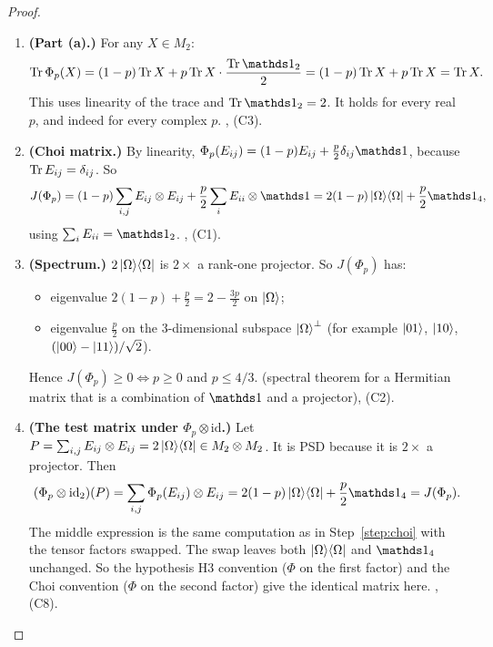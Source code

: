 \documentclass[11pt]{article}
\begin{document}
\begin{proof}
\begin{enumerate}
  \item\label{step:trace} \textbf{(Part (a).)} For any $X\in M_2$:
    \begin{equation}\label{eq:trace}
      \Tr\Phi_p(X)=(1-p)\Tr X+p\Tr X\cdot\frac{\Tr \id_2}{2}=(1-p)\Tr X+p\Tr X=\Tr X.
    \end{equation}
    This uses linearity of the trace and $\Tr\id_2=2$. It holds for every real $p$, and indeed
    for every complex $p$. \own, \computed{} (C3).

  \item\label{step:choi} \textbf{(Choi matrix.)} By linearity,
    $\Phi_p(E_{ij})=(1-p)E_{ij}+\tfrac p2\delta_{ij}\id$, because $\operatorname{Tr} E_{ij}=\delta_{ij}$. So
    \begin{equation}\label{eq:choi}
      J(\Phi_p)=(1-p)\sum_{i,j}E_{ij}\otimes E_{ij}+\frac p2\sum_i E_{ii}\otimes \id
      =2(1-p)\proj{\Omega}+\frac p2 \id_4,
    \end{equation}
    using $\sum_iE_{ii}=\id_2$. \own, \computed{} (C1).

  \item\label{step:spec} \textbf{(Spectrum.)} $2\left\lvert \Omega \right\rangle\!\left\langle \Omega \right\rvert$ is $2\times$ a rank-one
    projector. So $J(\Phi_p)$ has:
    \begin{itemize}
      \item eigenvalue $2(1-p)+\tfrac p2=2-\tfrac{3p}{2}$ on $\left\lvert \Omega \right\rangle$;
      \item eigenvalue $\tfrac p2$ on the 3-dimensional subspace $\left\lvert \Omega \right\rangle^\perp$ (for
        example $\left\lvert 01 \right\rangle$, $\left\lvert 10 \right\rangle$, $(\left\lvert 00 \right\rangle-\left\lvert 11 \right\rangle)/\sqrt2$).
    \end{itemize}
    Hence $J(\Phi_p)\ge0 \iff p\ge0$ and $p\le 4/3$. \own{} (spectral theorem for a Hermitian
    matrix that is a combination of $\id$ and a projector), \computed{} (C2).

  \item\label{step:test} \textbf{(The test matrix under $\Phi_p\otimes\mathrm{id}$.)} Let
    $P=\sum_{i,j}E_{ij}\otimes E_{ij}=2\left\lvert \Omega \right\rangle\!\left\langle \Omega \right\rvert\in M_2\otimes M_2$. It is PSD because it is
    $2\times$ a projector. Then
    \begin{equation}\label{eq:test}
      (\Phi_p\otimes\mathrm{id}_2)(P)=\sum_{i,j}\Phi_p(E_{ij})\otimes E_{ij}
      =2(1-p)\proj{\Omega}+\frac p2 \id_4=J(\Phi_p).
    \end{equation}
    The middle expression is the same computation as in Step~\ref{step:choi} with the tensor
    factors swapped. The swap leaves both $\left\lvert \Omega \right\rangle\!\left\langle \Omega \right\rvert$ and $\id_4$ unchanged. So the
    hypothesis H3 convention ($\Phi$ on the first factor) and the Choi convention ($\Phi$ on the
    second factor) give the identical matrix here. \own, \computed{} (C8).


\end{enumerate}
\end{proof}
\end{document}
